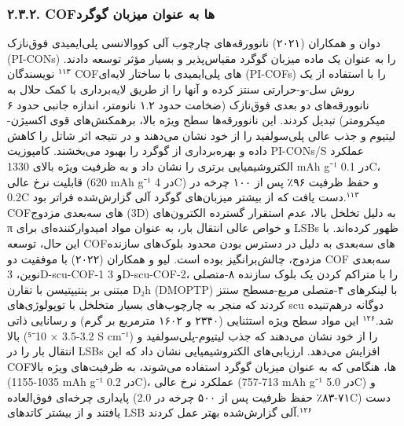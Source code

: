 \documentclass[12pt,a4paper,twocolumn]{article} %
\newcommand{\persian}[1]{\textfarsi{#1}}
\newcommand{\english}[1]{\textenglish{#1}}
\begin{document}
\subsubsection*{\persian{۲.۳.۲. \english{COF}ها به عنوان میزبان گوگرد}}
\persian{
دوان و همکاران (۲۰۲۱) نانوورقه‌های چارچوب آلی کووالانسی پلی‌ایمیدی فوق‌نازک (\english{PI-CONs}) را به عنوان یک ماده میزبان گوگرد مقیاس‌پذیر و بسیار مؤثر توسعه دادند.$^{۱۱۳}$ نویسندگان \english{COF}های پلی‌ایمیدی با ساختار لایه‌ای (\english{PI-COFs}) را با استفاده از یک روش سل-و-حرارتی سنتز کرده و آنها را از طریق لایه‌برداری با کمک حلال به نانوورقه‌های دو بعدی فوق‌نازک (ضخامت حدود ۱.۲ نانومتر، اندازه جانبی حدود ۶ میکرومتر) تبدیل کردند. این نانوورقه‌ها سطح ویژه بالا، برهمکنش‌های قوی اکسیژن-لیتیوم و جذب عالی پلی‌سولفید را از خود نشان می‌دهند و در نتیجه اثر شاتل را کاهش داده و بهره‌برداری از گوگرد را بهبود می‌بخشند. کامپوزیت \english{PI-CONs/S} عملکرد الکتروشیمیایی برتری را نشان داد و به ظرفیت ویژه بالای \english{1330 mAh g⁻¹} در \english{0.1C}، قابلیت نرخ عالی (\english{620 mAh g⁻¹} در \english{4C}) و حفظ ظرفیت ۹۶٪ پس از ۱۰۰ چرخه در \english{0.2C} دست یافت که از بیشتر میزبان‌های گوگرد آلی گزارش‌شده فراتر بود.$^{۱۱۳}$
}
\persian{
\english{COF}های سه‌بعدی مزدوج (\english{3D}) به دلیل تخلخل بالا، عدم استقرار گسترده الکترون‌های \english{π} و خواص عالی انتقال بار، به عنوان مواد امیدوارکننده‌ای برای \english{LSBs} ظهور کرده‌اند. با این حال، توسعه \english{COF}های سه‌بعدی به دلیل در دسترس بودن محدود بلوک‌های سازنده مزدوج، چالش‌برانگیز بوده است. لیو و همکاران (۲۰۲۲) با موفقیت دو \english{COF} سه‌بعدی نوین، \english{3D-scu-COF-1} و \english{3D-scu-COF-2}، را با متراکم کردن یک بلوک سازنده ۸-متصلی مبتنی بر پنتیپتیسن با تقارن \english{D₂h} (\english{DMOPTP}) با لینکرهای ۴-متصلی مربع-مسطح سنتز کردند که منجر به چارچوب‌های بسیار متخلخل با توپولوژی‌های \english{scu} دوگانه درهم‌تنیده شد.$^{۱۲۶}$ این مواد سطح ویژه استثنایی (۲۳۴۰ و ۱۶۰۲ مترمربع بر گرم) و رسانایی ذاتی بالا (\english{3.2-3.5 × 10⁻⁵ S cm⁻¹}) را از خود نشان می‌دهند که جذب لیتیوم-پلی‌سولفید و انتقال بار را در \english{LSBs} افزایش می‌دهد. ارزیابی‌های الکتروشیمیایی نشان داد که این \english{COF}ها، هنگامی که به عنوان میزبان گوگرد استفاده می‌شوند، به ظرفیت‌های ویژه بالا (\english{1035-1155 mAh g⁻¹} در \english{0.2C})، عملکرد نرخ عالی (\english{713-757 mAh g⁻¹} در \english{5.0C}) و پایداری چرخه‌ای فوق‌العاده (۷۱-۸۳٪ حفظ ظرفیت پس از ۵۰۰ چرخه در \english{2.0C}) دست یافتند و از بیشتر کاتدهای \english{LSB} آلی گزارش‌شده بهتر عمل کردند.$^{۱۲۶}$
}
\end{document}

